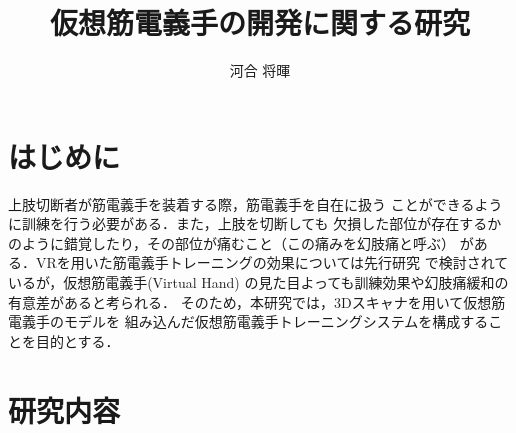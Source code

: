 \documentclass[11pt]{ltjsarticle}
\title{仮想筋電義手の開発に関する研究}
\author{河合 将暉}
\begin{document}
\maketitle

\section{はじめに}
	上肢切断者が筋電義手を装着する際，筋電義手を自在に扱う
	ことができるように訓練を行う必要がある．また，上肢を切断しても
	欠損した部位が存在するかのように錯覚したり，その部位が痛むこと（この痛みを幻肢痛と呼ぶ）
	がある．VRを用いた筋電義手トレーニングの効果については先行研究
	\cite{ref:1}%
	で検討されているが，仮想筋電義手(Virtual Hand)
	の見た目よっても訓練効果や幻肢痛緩和の有意差があると考られる．
	そのため，本研究では，3Dスキャナを用いて仮想筋電義手のモデルを
	組み込んだ仮想筋電義手トレーニングシステムを構成することを目的とする．
\section{研究内容}
\end{document}
